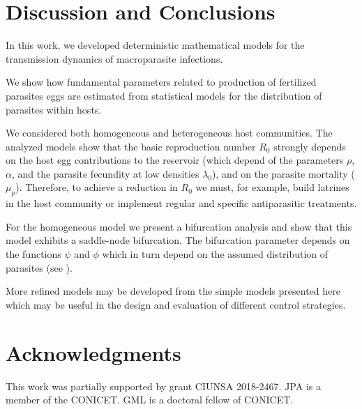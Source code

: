 \documentclass[eng]{MMSB-class-eng}
\begin{document}
\section{Discussion and Conclusions}

In this work, we developed deterministic mathematical models for the transmission dynamics of macroparasite infections. 

We show how fundamental parameters related to production of fertilized parasites eggs are estimated from statistical models for the distribution of
parasites within hosts.	

We considered both homogeneous and heterogeneous host communities. 
The analyzed models show that the basic reproduction number $R_0$ strongly depends 
on the
host egg contributions to the reservoir (which depend of the parameters $\rho$, $\alpha$, and the parasite fecundity at low densities $\lambda_0 $), and on the parasite mortality ($\mu_p$). 
Therefore, to achieve a reduction in $R_0$ we must, for example, build latrines in the host community or implement regular and specific antiparasitic treatments.

For the homogeneous model we present a bifurcation analysis and show that this model exhibits a saddle-node bifurcation.
The bifurcation parameter depends on the functions $\psi$ and $\phi$ which in turn depend on the assumed
distribution of parasites (see \citet{lopez2022general}).

More refined models may be developed from the simple models presented here which may be useful in the design and evaluation of different control strategies. 

\section{Acknowledgments}
This work was partially supported by grant CIUNSA 2018-2467. JPA is a member of the CONICET. GML is a doctoral fellow of CONICET.


\end{document}
